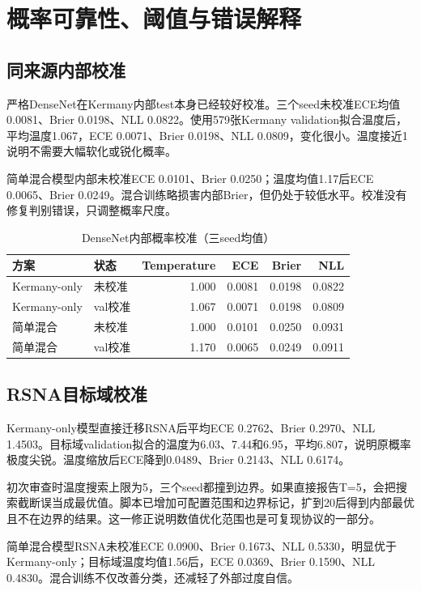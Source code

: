 \section{概率可靠性、阈值与错误解释}

\subsection{同来源内部校准}

严格DenseNet在Kermany内部test本身已经较好校准。三个seed未校准ECE均值0.0081、Brier 0.0198、NLL 0.0822。使用579张Kermany validation拟合温度后，平均温度1.067，ECE 0.0071、Brier 0.0198、NLL 0.0809，变化很小。温度接近1说明不需要大幅软化或锐化概率。

简单混合模型内部未校准ECE 0.0101、Brier 0.0250；温度均值1.17后ECE 0.0065、Brier 0.0249。混合训练略损害内部Brier，但仍处于较低水平。校准没有修复判别错误，只调整概率尺度。

\begin{table}[H]
\centering
\caption{DenseNet内部概率校准（三seed均值）}
\begin{tabular}{llrrrr}
\toprule 方案 & 状态 & Temperature & ECE & Brier & NLL\\\midrule
Kermany-only & 未校准 & 1.000 & 0.0081 & 0.0198 & 0.0822\\
Kermany-only & val校准 & 1.067 & 0.0071 & 0.0198 & 0.0809\\
简单混合 & 未校准 & 1.000 & 0.0101 & 0.0250 & 0.0931\\
简单混合 & val校准 & 1.170 & 0.0065 & 0.0249 & 0.0911\\\bottomrule
\end{tabular}
\end{table}

\subsection{RSNA目标域校准}

Kermany-only模型直接迁移RSNA后平均ECE 0.2762、Brier 0.2970、NLL 1.4503。目标域validation拟合的温度为6.03、7.44和6.95，平均6.807，说明原概率极度尖锐。温度缩放后ECE降到0.0489、Brier 0.2143、NLL 0.6174。

初次审查时温度搜索上限为5，三个seed都撞到边界。如果直接报告T=5，会把搜索截断误当成最优值。脚本已增加可配置范围和边界标记，扩到20后得到内部最优且不在边界的结果。这一修正说明数值优化范围也是可复现协议的一部分。

简单混合模型RSNA未校准ECE 0.0900、Brier 0.1673、NLL 0.5330，明显优于Kermany-only；目标域温度均值1.56后，ECE 0.0369、Brier 0.1590、NLL 0.4830。混合训练不仅改善分类，还减轻了外部过度自信。

